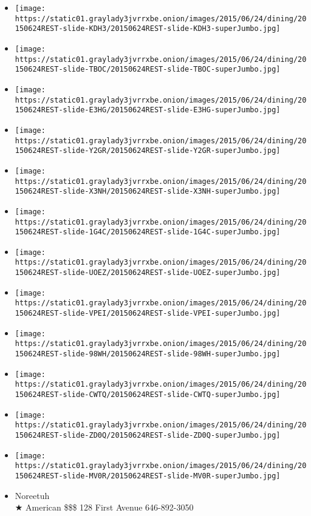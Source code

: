 \begin{itemize}
\item
  \texttt{[image: https://static01.graylady3jvrrxbe.onion/images/2015/06/24/dining/20150624REST-slide-KDH3/20150624REST-slide-KDH3-superJumbo.jpg]}
\item
  \texttt{[image: https://static01.graylady3jvrrxbe.onion/images/2015/06/24/dining/20150624REST-slide-TBOC/20150624REST-slide-TBOC-superJumbo.jpg]}
\item
  \texttt{[image: https://static01.graylady3jvrrxbe.onion/images/2015/06/24/dining/20150624REST-slide-E3HG/20150624REST-slide-E3HG-superJumbo.jpg]}
\item
  \texttt{[image: https://static01.graylady3jvrrxbe.onion/images/2015/06/24/dining/20150624REST-slide-Y2GR/20150624REST-slide-Y2GR-superJumbo.jpg]}
\item
  \texttt{[image: https://static01.graylady3jvrrxbe.onion/images/2015/06/24/dining/20150624REST-slide-X3NH/20150624REST-slide-X3NH-superJumbo.jpg]}
\item
  \texttt{[image: https://static01.graylady3jvrrxbe.onion/images/2015/06/24/dining/20150624REST-slide-1G4C/20150624REST-slide-1G4C-superJumbo.jpg]}
\item
  \texttt{[image: https://static01.graylady3jvrrxbe.onion/images/2015/06/24/dining/20150624REST-slide-UOEZ/20150624REST-slide-UOEZ-superJumbo.jpg]}
\item
  \texttt{[image: https://static01.graylady3jvrrxbe.onion/images/2015/06/24/dining/20150624REST-slide-VPEI/20150624REST-slide-VPEI-superJumbo.jpg]}
\item
  \texttt{[image: https://static01.graylady3jvrrxbe.onion/images/2015/06/24/dining/20150624REST-slide-98WH/20150624REST-slide-98WH-superJumbo.jpg]}
\item
  \texttt{[image: https://static01.graylady3jvrrxbe.onion/images/2015/06/24/dining/20150624REST-slide-CWTQ/20150624REST-slide-CWTQ-superJumbo.jpg]}
\item
  \texttt{[image: https://static01.graylady3jvrrxbe.onion/images/2015/06/24/dining/20150624REST-slide-ZD0Q/20150624REST-slide-ZD0Q-superJumbo.jpg]}
\item
  \texttt{[image: https://static01.graylady3jvrrxbe.onion/images/2015/06/24/dining/20150624REST-slide-MV0R/20150624REST-slide-MV0R-superJumbo.jpg]}
\end{itemize}

\begin{itemize}
\tightlist
\item
  Noreetuh\\
  ★ American \$\$\$ 128 First Avenue 646-892-3050
\end{itemize}


